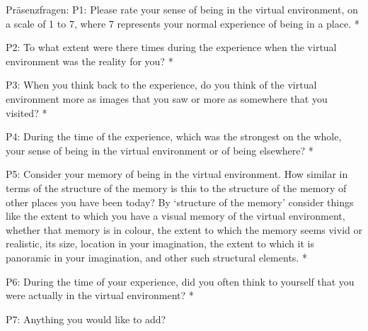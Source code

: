 Präsenzfragen:
P1: Please rate your sense of being in the virtual environment, on a scale of 1 to 7, where 7 represents your normal experience of being in a place. *

P2: To what extent were there times during the experience when the virtual environment was the reality for you? *

P3: When you think back to the experience, do you think of the virtual environment more as images that you saw or more as somewhere that you visited? *

P4: During the time of the experience, which was the strongest on the whole, your sense of being in the virtual environment or of being elsewhere? *

P5: Consider your memory of being in the virtual environment. How similar in terms of the structure of the memory is this to the structure of the memory of other places you have been today? By ‘structure of the memory’ consider things like the extent to which you have a visual memory of the virtual environment, whether that memory is in colour, the extent to which the memory seems vivid or realistic, its size, location in your imagination, the extent to which it is panoramic in your imagination, and other such structural elements. *

P6: During the time of your experience, did you often think to yourself that you were actually in the virtual environment? *

P7: Anything you would like to add?

